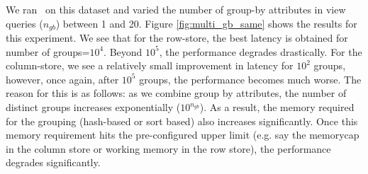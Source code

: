 We ran \VizRecDB\ on this dataset and varied the number of group-by
attributes in view queries ($n_{gb}$) between 1 and 20.
Figure \ref{fig:multi_gb_same} shows the results for this experiment.
We see that for the row-store, the best latency is obtained for number of
groups=$10^4$.
Beyond $10^5$, the performance degrades drastically. 
For the column-store, we see a relatively small improvement in latency
for $10^2$ groups, however, once again, after $10^5$ groups, the performance
becomes much worse.
The reason for this is as follows: as we combine group by attributes, the number
of distinct groups increases exponentially ($10^{n_{gb}}$). 
As a result, the memory required for the grouping (hash-based or sort based)
also increases significantly.
Once this memory requirement hits the pre-configured upper limit (e.g. say the
memorycap in the column store or working memory in the row store), the
performance degrades significantly.


